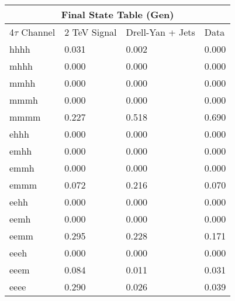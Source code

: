 \documentclass{article}
\begin{document}
 
\begin{landscape} 
\centering 
\begin{tabular}{|p{4.5cm}|p{3cm}|p{3cm}|p{3cm}|}\hline 
\multicolumn{4}{|c|}{Final State Table (Gen)} \\ 
\hline 
4$\tau$ Channel & 2 TeV Signal & Drell-Yan + Jets & Data \\ 
\hline 
hhhh & 0.031 & 0.002 & 0.000\\
\hline 
mhhh & 0.000 & 0.000 & 0.000\\
\hline 
mmhh & 0.000 & 0.000 & 0.000\\
\hline 
mmmh & 0.000 & 0.000 & 0.000\\
\hline 
mmmm & 0.227 & 0.518 & 0.690\\
\hline 
ehhh & 0.000 & 0.000 & 0.000\\
\hline 
emhh & 0.000 & 0.000 & 0.000\\
\hline 
emmh & 0.000 & 0.000 & 0.000\\
\hline 
emmm & 0.072 & 0.216 & 0.070\\
\hline 
eehh & 0.000 & 0.000 & 0.000\\
\hline 
eemh & 0.000 & 0.000 & 0.000\\
\hline 
eemm & 0.295 & 0.228 & 0.171\\
\hline 
eeeh & 0.000 & 0.000 & 0.000\\
\hline 
eeem & 0.084 & 0.011 & 0.031\\
\hline 
eeee & 0.290 & 0.026 & 0.039\\
\hline 
\end{tabular} 
\end{landscape} 
\end{document}
